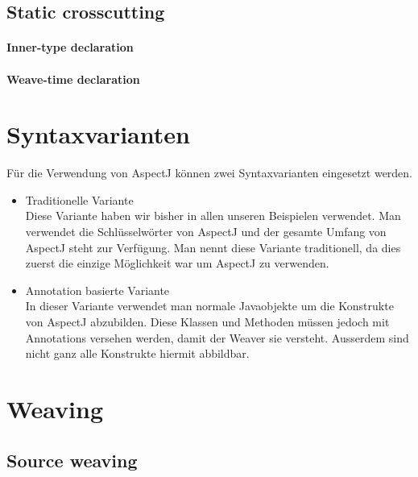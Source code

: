 

\subsection{Static crosscutting}

\paragraph{Inner-type declaration}

\paragraph{Weave-time declaration}

\section{Syntaxvarianten}
Für die Verwendung von AspectJ können zwei Syntaxvarianten eingesetzt werden.

\begin{itemize}
\item Traditionelle Variante \\
Diese Variante haben wir bisher in allen unseren Beispielen verwendet. Man verwendet die Schlüsselwörter von AspectJ und der gesamte Umfang von AspectJ steht zur Verfügung. Man nennt diese Variante traditionell, da dies zuerst die einzige Möglichkeit war um AspectJ zu verwenden.
\item Annotation basierte Variante \\
In dieser Variante verwendet man normale Javaobjekte um die Konstrukte von AspectJ abzubilden. Diese Klassen und Methoden müssen jedoch mit Annotations versehen werden, damit der Weaver sie versteht. Ausserdem sind nicht ganz alle Konstrukte hiermit abbildbar.
\end{itemize}



\section{Weaving}

\subsection{Source weaving}

